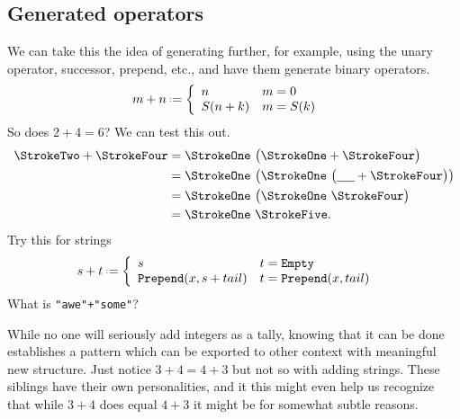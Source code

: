 \subsection{Generated operators}
We can take this the idea of generating further, for example, using 
the unary operator, successor, prepend, etc., and have them generate 
binary operators.
\begin{align*}
    m+n & \defeq\left\{ 
    \begin{array}{ll}
        n & m = 0\\
        S(n+k) & m=S(k)
    \end{array}
    \right.
\end{align*}
So does $2+4=6$?  We can test this out.
\begin{align*}
    \text{\StrokeTwo}+\text{\StrokeFour} & = \text{\StrokeOne}~ \big(\text{\StrokeOne} +\text{\StrokeFour}\big)\\
    & = \text{\StrokeOne}~ \big( \text{\StrokeOne}~\big(\underline{\hspace{5mm}}+\StrokeFour\big)\big)\\
    & = \text{\StrokeOne}~ \big( \text{\StrokeOne}~\StrokeFour\big)\\
    & = \text{\StrokeOne}~ \text{\StrokeFive}.
\end{align*}
Try this for strings
\begin{align*}
    s+t & \defeq\left\{ 
    \begin{array}{ll}
        s & t = \texttt{Empty}\\
        \texttt{Prepend}(x,s+tail) & t=\texttt{Prepend}(x,tail)
    \end{array}
    \right.
\end{align*}
What is \lstinline{"awe"+"some"}?  

While no one will seriously add integers as a tally, 
knowing that it can be done establishes a pattern which can be exported to other context
with meaningful new structure.  Just notice $3+4=4+3$ but not so with adding strings.
These siblings have their own personalities, and it this might even help us recognize 
that while $3+4$ does equal $4+3$ it might be for somewhat subtle reasons.

